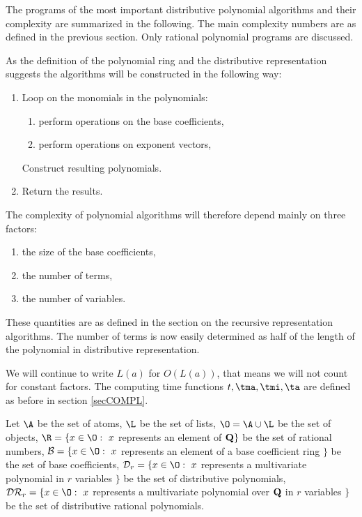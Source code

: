 \label{dip.alg}
The programs of the most important distributive polynomial algorithms 
and their complexity are summarized in the following.
The main complexity numbers are as defined in 
the previous section.  
Only rational polynomial programs are discussed.

As the definition of the polynomial ring 
and the distributive representation suggests 
the algorithms will be constructed in the following way:
\begin{enumerate}
\item Loop on the monomials in the polynomials:
      \begin{enumerate}
      \item perform operations on the base coefficients,
      \item perform operations on exponent vectors, 
      \end{enumerate}
      Construct resulting polynomials.
\item Return the results. 
\end{enumerate}

The complexity of polynomial algorithms will 
therefore depend mainly on three factors:
\begin{enumerate}
\item the size of the base coefficients,
\item the number of terms,
\item the number of variables. 
\end{enumerate}
These quantities are as defined in the section on the  
recursive representation algorithms.
The number of terms is now easily determined as 
half of the length of the polynomial in distributive 
representation.

We will continue to write $L(a)$ for $O(L(a))$, 
that means we will not count for constant factors.
The computing time functions $t, \tma, \tmi, \ta$ 
are defined as before in section \ref{secCOMPL}.

\def\DIR{{\cal DR}}
\def\DI{{\cal D}}
\def\B{{\cal B}}
Let
$\A$ be the set of atoms,
$\L$ be the set of lists,
$\O = \A \cup \L$ be the set of objects,
$\R = \{ x \in \O: \ x$ represents an element of ${\rm \bf Q} \}$ 
be the set of rational numbers, 
$\B = \{ x \in \O: \ x$ represents an element of a 
         base coefficient ring $\}$ 
be the set of base coefficients, 
$\DI_r = \{ x \in \O: \ x$ represents a multivariate polynomial 
         in $r$ variables $\}$ 
be the set of distributive polynomials,
$\DIR_r = \{ x \in \O: \ x$ represents a multivariate polynomial over
           ${\rm \bf Q}$ in $r$ variables $\}$ 
be the set of distributive rational polynomials. 

